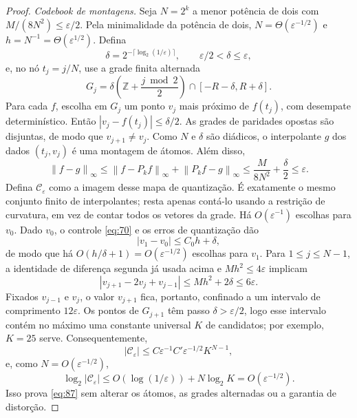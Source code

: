 \documentclass[11pt,a4paper]{article}
\theoremstyle{preciso}
\theoremstyle{definition}
\newcommand{\Z}{\mathbb Z}
\newcommand{\CC}{\mathcal C}
\newcommand{\norm}[1]{\left\|#1\right\|_{\infty}}
\newcommand{\eqn}[2]{\begin{equation}\label{eq:#1}#2\end{equation}}
\begin{document}
\begin{proof}
\emph{Codebook de montagens.} Seja $N=2^k$ a menor potência de dois com $M/(8N^2)\le\varepsilon/2$. Pela minimalidade da potência de dois, $N=\Theta(\varepsilon^{-1/2})$ e $h=N^{-1}=\Theta(\varepsilon^{1/2})$. Defina
\[
\delta=2^{-\lceil\log_2(1/\varepsilon)\rceil},\qquad
\varepsilon/2<\delta\le\varepsilon,
\]
e, no nó $t_j=j/N$, use a grade finita alternada
\eqn{88}{G_j=\delta\left(\Z+\frac{j\bmod2}{2}\right)\cap[-R-\delta,R+\delta].}
Para cada $f$, escolha em $G_j$ um ponto $v_j$ mais próximo de $f(t_j)$, com desempate determinístico. Então $|v_j-f(t_j)|\le\delta/2$. As grades de paridades opostas são disjuntas, de modo que $v_{j+1}\ne v_j$. Como $N$ e $\delta$ são diádicos, o interpolante $g$ dos dados $(t_j,v_j)$ é uma montagem de átomos. Além disso,
\[
\norm{f-g}\le\norm{f-P_kf}+\norm{P_kf-g}
\le\frac M{8N^2}+\frac\delta2\le\varepsilon.
\]
Defina $\CC_\varepsilon$ como a imagem desse mapa de quantização. É exatamente o mesmo conjunto finito de interpolantes; resta apenas contá-lo usando a restrição de curvatura, em vez de contar todos os vetores da grade. Há $O(\varepsilon^{-1})$ escolhas para $v_0$. Dado $v_0$, o controle \eqref{eq:70} e os erros de quantização dão
\[
|v_1-v_0|\le C_0h+\delta,
\]
de modo que há $O(h/\delta+1)=O(\varepsilon^{-1/2})$ escolhas para $v_1$. Para $1\le j\le N-1$, a identidade de diferença segunda já usada acima e $Mh^2\le4\varepsilon$ implicam
\[
|v_{j+1}-2v_j+v_{j-1}|\le Mh^2+2\delta\le6\varepsilon.
\]
Fixados $v_{j-1}$ e $v_j$, o valor $v_{j+1}$ fica, portanto, confinado a um intervalo de comprimento $12\varepsilon$. Os pontos de $G_{j+1}$ têm passo $\delta>\varepsilon/2$, logo esse intervalo contém no máximo uma constante universal $K$ de candidatos; por exemplo, $K=25$ serve. Consequentemente,
\[
|\CC_\varepsilon|\le C\varepsilon^{-1}C'\varepsilon^{-1/2}K^{N-1},
\]
e, como $N=O(\varepsilon^{-1/2})$,
\[
\log_2|\CC_\varepsilon|\le O(\log(1/\varepsilon))+N\log_2K=O(\varepsilon^{-1/2}).
\]
Isso prova \eqref{eq:87} sem alterar os átomos, as grades alternadas ou a garantia de distorção.
\end{proof}
\end{document}
